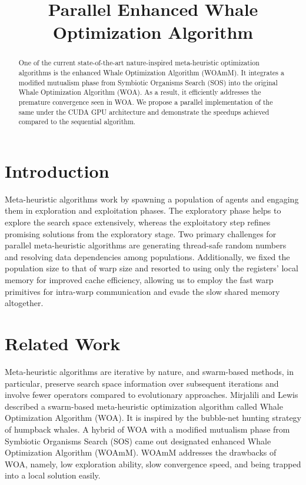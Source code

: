 \documentclass[conference]{IEEEtran}
\begin{document}
\title{Parallel Enhanced Whale Optimization Algorithm}

\author{
}

\maketitle

\begin{abstract}

    One of the current state-of-the-art nature-inspired meta-heuristic optimization algorithms is the enhanced Whale Optimization Algorithm (WOAmM). 
    It integrates a modified mutualism phase from Symbiotic Organisms Search (SOS) into the original Whale Optimization Algorithm (WOA). 
    As a result, it efficiently addresses the premature convergence seen in WOA. 
    We propose a parallel implementation of the same under the CUDA GPU architecture and demonstrate the speedups achieved compared to the sequential algorithm.

\end{abstract}

\section{Introduction}
\label{intro}

Meta-heuristic algorithms work by spawning a population of agents and engaging them in exploration and exploitation phases. 
The exploratory phase helps to explore the search space extensively, whereas the exploitatory step refines promising solutions from the exploratory stage. 
Two primary challenges for parallel meta-heuristic algorithms are generating thread-safe random numbers and resolving data dependencies among populations. 
Additionally, we fixed the population size to that of warp size and resorted to using only the registers’ local memory for improved cache efficiency, 
allowing us to employ the fast warp primitives for intra-warp communication and evade the slow shared memory altogether.

\section{Related Work}

Meta-heuristic algorithms are iterative by nature, and swarm-based methods, in particular, 
preserve search space information over subsequent iterations and involve fewer operators compared to evolutionary approaches. 
Mirjalili and Lewis \cite{MIRJALILI201651} described a swarm-based meta-heuristic optimization algorithm called Whale Optimization Algorithm (WOA). 
It is inspired by the bubble-net hunting strategy of humpback whales. 
A hybrid of WOA with a modified mutualism phase from Symbiotic Organisms Search (SOS) came out designated enhanced Whale Optimization Algorithm (WOAmM)\cite{CHAKRABORTY2021107086}. 
WOAmM addresses the drawbacks of WOA, namely, low exploration ability, slow convergence speed, and being trapped into a local solution easily.
\end{document}

